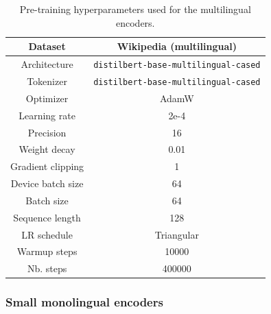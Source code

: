 \begin{table}[H]
\centering
\small
\begin{tabular}{c|c}
\toprule
Dataset & Wikipedia (multilingual)  \\ \hline
Architecture & \tiny{\texttt{distilbert-base-multilingual-cased}} \\ \hline
Tokenizer & \tiny{\texttt{distilbert-base-multilingual-cased}} \\ \hline
Optimizer         & AdamW      \\ \hline
Learning rate     & 2e-4       \\ \hline
Precision  & 16 \\ \hline
Weight decay      & 0.01       \\ \hline
Gradient clipping & 1          \\ \hline
Device batch size        & 64         \\ \hline
Batch size        & 64        \\ \hline
Sequence length   & 128        \\ \hline
LR schedule       & Triangular \\ \hline
Warmup steps      & 10000      \\ \hline
Nb. steps         & 400000        \\ \bottomrule
\end{tabular}
\caption{Pre-training hyperparameters used for the multilingual encoders.}
\end{table}

\subsubsection{Small monolingual encoders}
\label{app:s_train_mono_enc}


